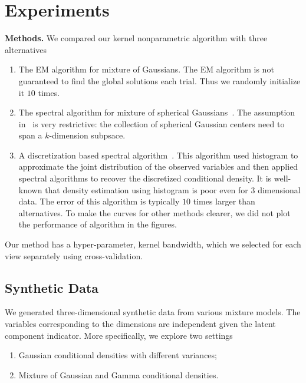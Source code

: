 \documentclass{article}
\begin{document}
\section{Experiments}

{\bf Methods.} We compared our kernel nonparametric algorithm with three alternatives
\begin{enumerate}
  \item The EM algorithm for mixture of Gaussians. The EM algorithm is not guaranteed to find the global solutions each trial. Thus we randomly initialize it $10$ times.
  \item The spectral algorithm for mixture of spherical Gaussians~\citep{Hsu13}. The assumption in~\citet{Hsu13} is very restrictive: the collection of spherical Gaussian centers need to span a $k$-dimension subpsace.
  \item A discretization based spectral algorithm~\citep{Hiroyuki10}. This algorithm used histogram to approximate the joint distribution of the observed variables and then applied spectral algorithms to recover the discretized conditional density. It is well-known that density estimation using histogram is poor even for 3 dimensional data. The error of this algorithm is typically $10$ times larger than alternatives. To make the curves for other methods clearer, we did not plot the performance of \citet{Hiroyuki10} algorithm in the figures.
\end{enumerate}
Our method has a hyper-parameter, kernel bandwidth, which we selected for each view separately using cross-validation.

\subsection{Synthetic Data} 

We generated three-dimensional synthetic data from various mixture models. The variables corresponding to the dimensions are independent given the latent component indicator. More specifically, we explore two settings
\begin{enumerate}
  \item Gaussian conditional densities with different variances;
  \item Mixture of Gaussian and  Gamma conditional densities.
\end{enumerate}
\end{document}
